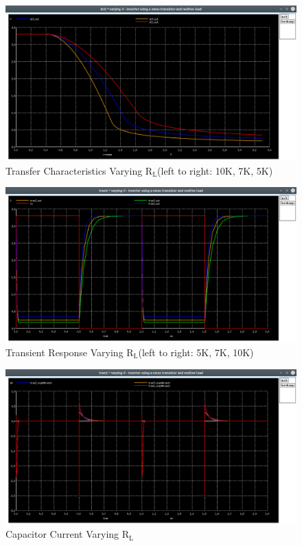 \documentclass[12pt, a4paper]{article}
\begin{document}
	\begin{figure}[H]
		\begin{center}
			\includegraphics[scale=0.25]{images/inverter_Rl_dc.png}
			\caption{Transfer Characteristics Varying $\text{R}_\text{L}$(left to right: 10K, 7K, 5K)}
			\label{fig::varying_rl_dc}
		\end{center}
	\end{figure}
	\begin{figure}[H]
		\begin{center}
			\includegraphics[scale=0.25]{images/inverter_Rl_tran.png}
			\caption{Transient Response Varying $\text{R}_\text{L}$(left to right: 5K, 7K, 10K)}
			\label{fig::varying_rl_time}
		\end{center}
	\end{figure}
	
	\begin{figure}[H]
		\begin{center}
			\includegraphics[scale=0.25]{images/inverter_Rl_vcap.png}
			\caption{Capacitor Current Varying $\text{R}_\text{L}$}
			\label{fig::varying_rl_vcap}
		\end{center}
	\end{figure}
	
\end{document}
